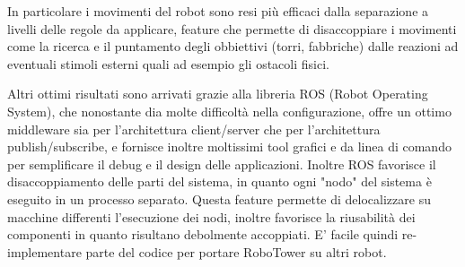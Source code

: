 In particolare i movimenti del robot sono resi più efficaci dalla separazione a livelli delle regole da applicare, feature che permette di disaccoppiare i movimenti come la ricerca e il puntamento degli obbiettivi (torri, fabbriche) dalle reazioni ad eventuali stimoli esterni quali ad esempio gli ostacoli fisici.

Altri ottimi risultati sono arrivati grazie alla libreria ROS (Robot Operating System), che nonostante dia molte difficoltà nella configurazione, offre un ottimo middleware sia per l'architettura client/server che per l'architettura publish/subscribe, e fornisce inoltre moltissimi tool grafici e da linea di comando per semplificare il debug e il design delle applicazioni. Inoltre ROS favorisce il disaccoppiamento delle parti del sistema, in quanto ogni "nodo" del sistema è eseguito in un processo separato. Questa feature permette di delocalizzare su macchine differenti l'esecuzione dei nodi, inoltre favorisce la riusabilità dei componenti in quanto risultano debolmente accoppiati. E' facile quindi re-implementare parte del codice per portare RoboTower su altri robot.